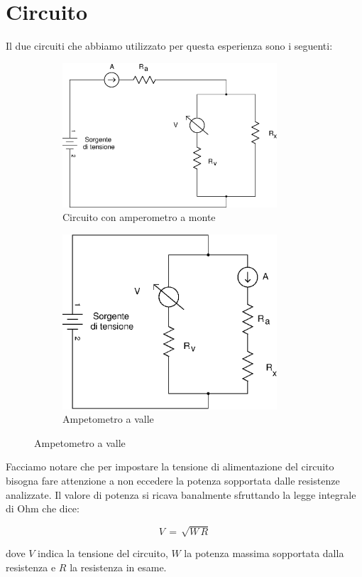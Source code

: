 \section*{Circuito}

Il due circuiti che abbiamo utilizzato per questa esperienza sono i seguenti:

\begin{figure}[h]
  \centering
  \begin{subfigure}[b]{0.45\textwidth}
    \includegraphics[width=8cm]{monte.eps}
    \caption{Circuito con amperometro a monte}
    \label{fig:monte}
  \end{subfigure}
  \qquad
  \begin{subfigure}[b]{0.45\textwidth}
    \includegraphics[width=8cm]{valle.eps}
    \caption{Ampetometro a valle}
    \label{fig:valle}
  \end{subfigure}
\end{figure}

Facciamo notare che per impostare la tensione di alimentazione del circuito bisogna fare attenzione a non eccedere la potenza sopportata dalle resistenze analizzate. Il valore di potenza si ricava banalmente sfruttando la legge integrale di Ohm che dice:

\begin{equation}
	V \,=\, \sqrt{W\,R}
\end{equation}

dove $V$ indica la tensione del circuito, $W$ la potenza massima sopportata dalla resistenza e $R$ la resistenza in esame.




